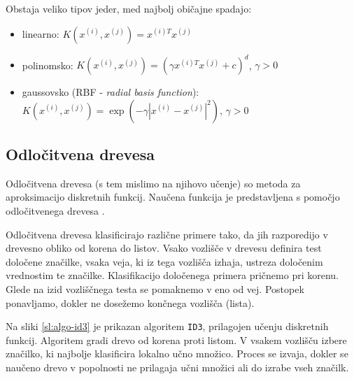 \documentclass[11pt,a4paper,openany]{book}
\begin{document}
Obstaja veliko tipov jeder, med najbolj običajne spadajo:
\begin{itemize}
	\item linearno: $K(x^{(i)}, x^{(j)}) = x^{(i)T}x^{(j)}$
	\item polinomsko: $K(x^{(i)}, x^{(j)}) = (\gamma x^{(i)T}x^{(j)} + c)^d$, $\gamma > 0$ 
	\item gaussovsko (RBF - \textit{radial basis function}): $K(x^{(i)}, x^{(j)}) = \exp(-\gamma |x^{(i)}-x^{(j)}|^2)$, $\gamma > 0$ 
\end{itemize}

\subsection{Odločitvena drevesa}
\label{sc:decisiontrees}
Odločitvena drevesa (s tem mislimo na njihovo učenje) so metoda za aproksimacijo diskretnih funkcij. Naučena funkcija je predstavljena s pomočjo odločitvenega drevesa \cite{Mitchell1997}. 

Odločitvena drevesa klasificirajo različne primere tako, da jih razporedijo v drevesno obliko od korena do listov. Vsako vozlišče v drevesu definira test določene značilke, vsaka veja, ki iz tega vozlišča izhaja, ustreza določenim vrednostim te značilke. Klasifikacijo določenega primera pričnemo pri korenu. Glede na izid vozliščnega testa se pomaknemo v eno od vej. Postopek ponavljamo, dokler ne dosežemo končnega vozlišča (lista).

Na sliki \ref{sl:algo-id3} je prikazan algoritem \texttt{ID3}, prilagojen učenju diskretnih funkcij. Algoritem gradi drevo od korena proti listom. V vsakem vozlišču izbere značilko, ki najbolje klasificira lokalno učno množico. Proces se izvaja, dokler se naučeno drevo v popolnosti ne prilagaja učni množici ali do izrabe vseh značilk.

\SetStartEndCondition{ }{}{}
\end{document}
